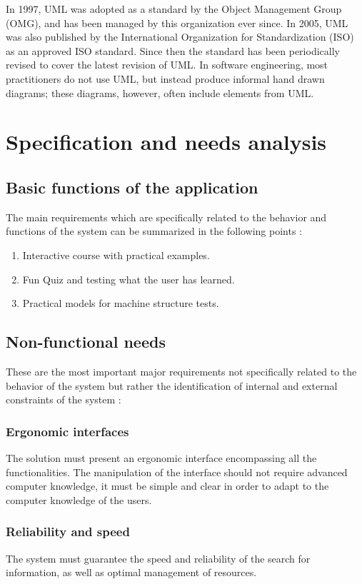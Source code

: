 In 1997, UML was adopted as a standard by the Object Management Group (OMG), and has been managed by this organization ever since. In 2005, UML was also published by the International Organization for Standardization (ISO) as an approved ISO standard. Since then the standard has been periodically revised to cover the latest revision of UML. In software engineering, most practitioners do not use UML, but instead produce informal hand drawn diagrams; these diagrams, however, often include elements from UML.\cite{YThi-UML}




\section{Specification and needs analysis}

\subsection{Basic functions of the application}
The main requirements which are specifically related to the behavior and functions of the system can be summarized in the following points :
\begin{enumerate}
	\item Interactive course with practical examples.
	\item Fun Quiz and testing what the user has learned.
	\item Practical models for machine structure tests.
\end{enumerate} 
\subsection{Non-functional needs}
These are the most important major requirements not specifically related to the behavior of the system but rather the identification of internal and external constraints of the system :
\subsubsection{Ergonomic interfaces}
The solution must present an ergonomic interface encompassing all the functionalities. The manipulation of the interface should not require advanced computer knowledge, it must be simple and clear in order to adapt to the computer knowledge of the users.
\subsubsection{Reliability and speed}
The system must guarantee the speed and reliability of the search for information, as well as optimal management of resources.
